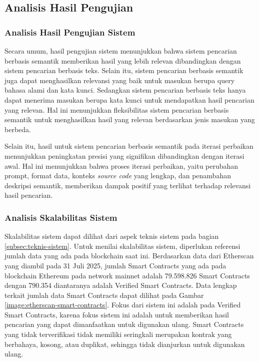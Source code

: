 \subsection{Analisis Hasil Pengujian}

\subsubsection{Analisis Hasil Pengujian Sistem}

Secara umum, hasil pengujian sistem menunjukkan bahwa sistem pencarian berbasis semantik memberikan hasil yang lebih relevan dibandingkan dengan sistem pencarian berbasis teks. Selain itu, sistem pencarian berbasis semantik juga dapat menghasilkan relevansi yang baik untuk masukan berupa query bahasa alami dan kata kunci. Sedangkan sistem pencarian berbasis teks hanya dapat menerima masukan berupa kata kunci untuk mendapatkan hasil pencarian yang relevan. Hal ini menunjukkan fleksibilitas sistem pencarian berbasis semantik untuk menghasilkan hasil yang relevan berdasarkan jenis masukan yang berbeda.

Selain itu, hasil untuk sistem pencarian berbasis semantik pada iterasi perbaikan menunjukkan peningkatan presisi yang signifikan dibandingkan dengan iterasi awal. Hal ini menunjukkan bahwa proses iterasi perbaikan, yaitu perubahan prompt, format data, konteks \textit{source code} yang lengkap, dan penambahan deskripsi semantik, memberikan dampak positif yang terlihat terhadap relevansi hasil pencarian.

\subsubsection{Analisis Skalabilitas Sistem}

Skalabilitas sistem dapat dilihat dari aspek teknis sistem pada bagian \ref{subsec:teknis-sistem}. Untuk menilai skalabilitas sistem, diperlukan referensi jumlah data yang ada pada blockchain saat ini. Berdasarkan data dari Etherscan yang diambil pada 31 Juli 2025, jumlah Smart Contracts yang ada pada blockchain Ethereum pada network mainnet adalah 79.598.826 Smart Contracts dengan 790.354 diantaranya adalah Verified Smart Contracts. Data lengkap terkait jumlah data Smart Contracts dapat dilihat pada Gambar \ref{image:etherscan-smart-contracts}. Fokus dari sistem ini adalah pada Verified Smart Contracts, karena fokus sistem ini adalah untuk memberikan hasil pencarian yang dapat dimanfaatkan untuk digunakan ulang. Smart Contracts yang tidak terverifikasi tidak memiliki seringkali merupakan kontrak yang berbahaya, kosong, atau duplikat, sehingga tidak dianjurkan untuk digunakan ulang.

